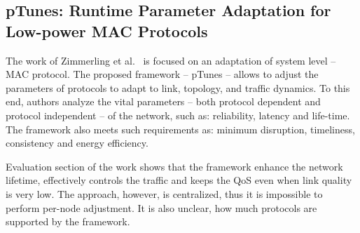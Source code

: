 \subsection*{pTunes: Runtime Parameter Adaptation for Low-power MAC Protocols}

The work of Zimmerling et al.~\cite{zimmerling12} is focused on an adaptation of system level -- MAC
protocol. The proposed framework -- pTunes -- allows to adjust the parameters
of protocols to adapt to link, topology, and traffic dynamics. To this end, authors
analyze the vital parameters -- both protocol dependent and protocol independent
-- of the network, such as: reliability, latency and life-time. The framework also
meets such requirements as: minimum disruption, timeliness, consistency and
energy efficiency.

Evaluation section of the work shows that the framework enhance the network
lifetime, effectively controls the traffic and keeps the QoS even when link
quality is very low. The approach, however, is centralized, thus it is
impossible to perform per-node adjustment. It is also unclear, how much
protocols are supported by the framework.